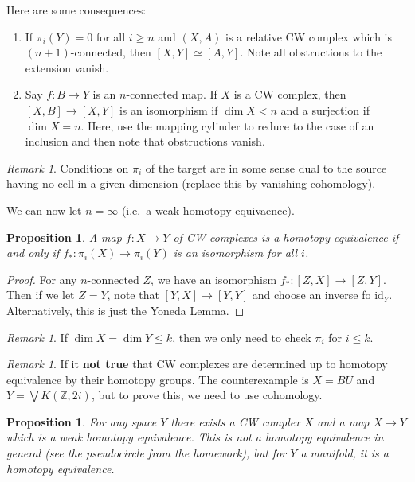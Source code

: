 \documentclass[leqno, openany]{memoir}
\newtheorem{prop}[thm]{Proposition}
\theoremstyle{definition}
\theoremstyle{remark}
\newtheorem{rmk}[thm]{Remark}
\theoremstyle{plain}
\theoremstyle{definition}
\theoremstyle{remark}
\newcommand{\Z}{\mathbb{Z}}
\newcommand{\mr}[1]{\mathrm{#1}}
\begin{document}
Here are some consequences:
\begin{enumerate}
    \item If $\pi_i(Y) = 0$ for all $i \geq n$ and $(X,A)$ is a relative CW complex which is $(n+1)$-connected, then $[X,Y] \simeq [A,Y]$. Note all obstructions to the extension vanish.
    \item Say $f \colon B \to Y$ is an $n$-connected map. If $X$ is a CW complex, then $[X,B] \to [X,Y]$ is an isomorphism if $\dim X < n$ and a surjection if $\dim X = n$. Here, use the mapping cylinder to reduce to the case of an inclusion and then note that obstructions vanish.
\end{enumerate}

\begin{rmk}
    Conditions on $\pi_i$ of the target are in some sense dual to the source having no cell in a given dimension (replace this by vanishing cohomology).
\end{rmk}

We can now let $n = \infty$ (i.e.~a weak homotopy equivaence).

\begin{prop}
    A map $f \colon X \to Y$ of CW complexes is a homotopy equivalence if and only if $f_* \colon \pi_i(X) \to \pi_i(Y)$ is an isomorphism for all $i$.
\end{prop}

\begin{proof}
    For any $n$-connected $Z$, we have an isomorphism $f_* \colon [Z,X] \to [Z,Y]$. Then if we let $Z = Y$, note that $[Y,X] \to [Y,Y]$ and choose an inverse fo $\mr{id}_Y$. Alternatively, this is just the Yoneda Lemma.
\end{proof}

\begin{rmk}
    If $\dim X = \dim Y \leq k$, then we only need to check $\pi_i$ for $i \leq k$.
\end{rmk}

\begin{rmk}
    If it \textbf{not true} that CW complexes are determined up to homotopy equivalence by their homotopy groups. The counterexample is $X = BU$ and $Y = \bigvee K(\Z, 2i)$, but to prove this, we need to use cohomology. 
\end{rmk}

\begin{prop}
    For any space $Y$ there exists a CW complex $X$ and a map $X \to Y$ which is a weak homotopy equivalence. This is not a homotopy equivalence in general (see the pseudocircle from the homework), but for $Y$ a manifold, it is a homotopy equivalence.
\end{prop}
\end{document}
